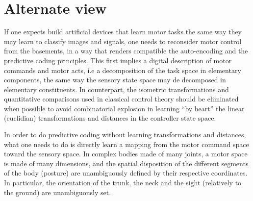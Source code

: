 \documentclass[11pt]{article}
\begin{document}
\section{Alternate view}






If one expects build artificial devices that learn motor tasks the same way they may learn to classify images and signals, one needs to reconsider motor control from the basements, in a way that renders compatible the auto-encoding and the predictive coding principles.  
This first implies a digital description of motor commands and motor acts, i.e a decomposition of the task space in elementary components, the same way the sensory state space may de decomposed in elementary constituents. In counterpart, the isometric transformations and quantitative comparisons used in classical control theory should be eliminated when possible to avoid combinatorial explosion in learning ``by heart'' the linear (euclidian) transformations and distances in the controller state space. 

In order to do predictive coding without learning transformations and distances, what one needs to do is directly learn a mapping from the motor command space toward the sensory space. 
In complex bodies made of many joints, a motor space is made of many dimensions, and the spatial disposition of the different segments of the body (posture) are unambiguously defined by their respective coordinates. In particular, the orientation of the trunk, the neck and the sight (relatively to the ground) are unambiguously set. 
\end{document}
